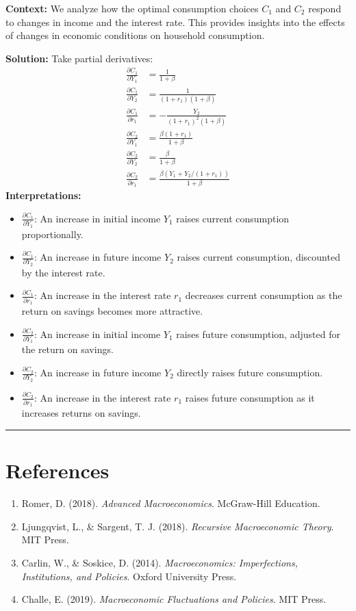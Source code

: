\documentclass{article}
\begin{document}
\textbf{Context:} We analyze how the optimal consumption choices \( C_1 \) and \( C_2 \) respond to changes in income and the interest rate. This provides insights into the effects of changes in economic conditions on household consumption.

\textbf{Solution:}
Take partial derivatives:
\begin{align*}
    \frac{\partial C_1}{\partial Y_1} &= \frac{1}{1 + \beta} \\
    \frac{\partial C_1}{\partial Y_2} &= \frac{1}{(1 + r_1)(1 + \beta)} \\
    \frac{\partial C_1}{\partial r_1} &= -\frac{Y_2}{(1 + r_1)^2 (1 + \beta)} \\
    \frac{\partial C_2}{\partial Y_1} &= \frac{\beta (1 + r_1)}{1 + \beta} \\
    \frac{\partial C_2}{\partial Y_2} &= \frac{\beta}{1 + \beta} \\
    \frac{\partial C_2}{\partial r_1} &= \frac{\beta (Y_1 + Y_2/(1 + r_1))}{1 + \beta}
\end{align*}
\textbf{Interpretations:}
\begin{itemize}
    \item \textbf{\( \frac{\partial C_1}{\partial Y_1} \)}: An increase in initial income \( Y_1 \) raises current consumption proportionally.
    \item \textbf{\( \frac{\partial C_1}{\partial Y_2} \)}: An increase in future income \( Y_2 \) raises current consumption, discounted by the interest rate.
    \item \textbf{\( \frac{\partial C_1}{\partial r_1} \)}: An increase in the interest rate \( r_1 \) decreases current consumption as the return on savings becomes more attractive.
    \item \textbf{\( \frac{\partial C_2}{\partial Y_1} \)}: An increase in initial income \( Y_1 \) raises future consumption, adjusted for the return on savings.
    \item \textbf{\( \frac{\partial C_2}{\partial Y_2} \)}: An increase in future income \( Y_2 \) directly raises future consumption.
    \item \textbf{\( \frac{\partial C_2}{\partial r_1} \)}: An increase in the interest rate \( r_1 \) raises future consumption as it increases returns on savings.
\end{itemize}

\noindent\rule{\linewidth}{1pt}

\section{References}
\begin{enumerate}
    \item Romer, D. (2018). \textit{Advanced Macroeconomics}. McGraw-Hill Education.
    \item Ljungqvist, L., \& Sargent, T. J. (2018). \textit{Recursive Macroeconomic Theory}. MIT Press.
    \item Carlin, W., \& Soskice, D. (2014). \textit{Macroeconomics: Imperfections, Institutions, and Policies}. Oxford University Press.
    \item Challe, E. (2019). \textit{Macroeconomic Fluctuations and Policies}. MIT Press.
\end{enumerate}
\end{document}
